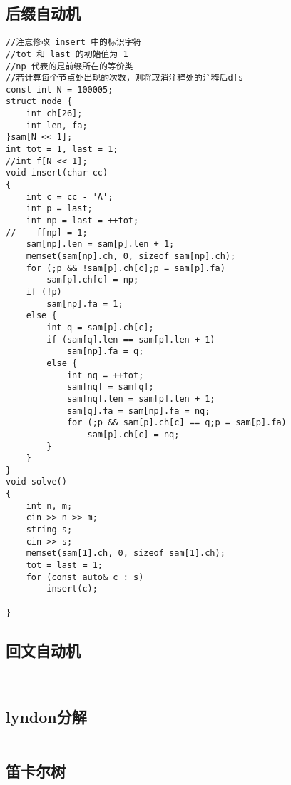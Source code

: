 \documentclass[twocolumn,a4]{article}
\begin{document}
\subsection{后缀自动机}
\begin{lstlisting}
//注意修改 insert 中的标识字符
//tot 和 last 的初始值为 1
//np 代表的是前缀所在的等价类
//若计算每个节点处出现的次数，则将取消注释处的注释后dfs
const int N = 100005;
struct node {
    int ch[26];
    int len, fa;
}sam[N << 1];
int tot = 1, last = 1;
//int f[N << 1];
void insert(char cc)
{
    int c = cc - 'A';
    int p = last;
    int np = last = ++tot;
//    f[np] = 1;
    sam[np].len = sam[p].len + 1;
    memset(sam[np].ch, 0, sizeof sam[np].ch);
    for (;p && !sam[p].ch[c];p = sam[p].fa)
        sam[p].ch[c] = np;
    if (!p)
        sam[np].fa = 1;
    else {
        int q = sam[p].ch[c];
        if (sam[q].len == sam[p].len + 1)
            sam[np].fa = q;
        else {
            int nq = ++tot;
            sam[nq] = sam[q];
            sam[nq].len = sam[p].len + 1;
            sam[q].fa = sam[np].fa = nq;
            for (;p && sam[p].ch[c] == q;p = sam[p].fa)
                sam[p].ch[c] = nq;
        }
    }
}
void solve()
{
    int n, m;
    cin >> n >> m;
    string s;
    cin >> s;
    memset(sam[1].ch, 0, sizeof sam[1].ch);
    tot = last = 1;
    for (const auto& c : s)
        insert(c);

}
\end{lstlisting}

\subsection{回文自动机}
\begin{lstlisting}
    
\end{lstlisting}

\subsection{lyndon分解}
\begin{lstlisting}

\end{lstlisting}
\subsection{笛卡尔树}
\begin{lstlisting}

\end{lstlisting}
\end{document}
